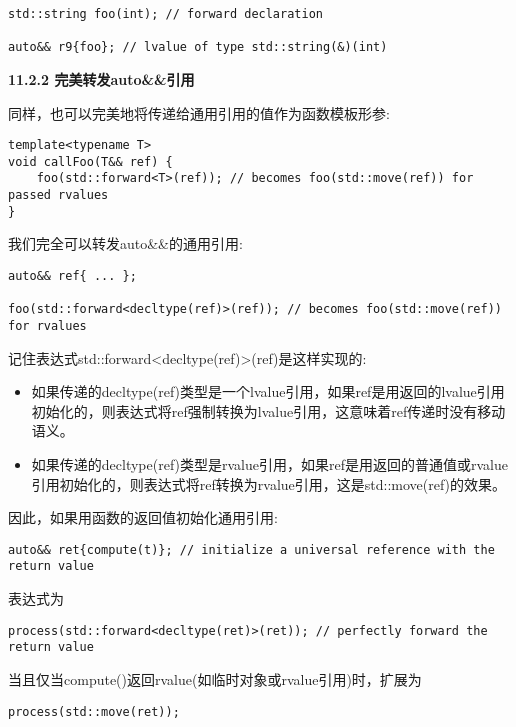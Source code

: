 \begin{lstlisting}[caption={}]
std::string foo(int); // forward declaration

auto&& r9{foo}; // lvalue of type std::string(&)(int)
\end{lstlisting}

\hspace*{\fill} \par %
\textbf{11.2.2 完美转发auto\&\&引用}

同样，也可以完美地将传递给通用引用的值作为函数模板形参:\par

\begin{lstlisting}[caption={}]
template<typename T>
void callFoo(T&& ref) {
	foo(std::forward<T>(ref)); // becomes foo(std::move(ref)) for passed rvalues
}
\end{lstlisting}

我们完全可以转发auto\&\&的通用引用:\par

\begin{lstlisting}[caption={}]
auto&& ref{ ... };

foo(std::forward<decltype(ref)>(ref)); // becomes foo(std::move(ref)) for rvalues
\end{lstlisting}

记住表达式std::forward<decltype(ref)>(ref)是这样实现的:\par

\begin{itemize}
	\item 如果传递的decltype(ref)类型是一个lvalue引用，如果ref是用返回的lvalue引用初始化的，则表达式将ref强制转换为lvalue引用，这意味着ref传递时没有移动语义。
	\item 如果传递的decltype(ref)类型是rvalue引用，如果ref是用返回的普通值或rvalue引用初始化的，则表达式将ref转换为rvalue引用，这是std::move(ref)的效果。
\end{itemize}

因此，如果用函数的返回值初始化通用引用:\par

\begin{lstlisting}[caption={}]
auto&& ret{compute(t)}; // initialize a universal reference with the return value
\end{lstlisting}

表达式为\par

\begin{lstlisting}[caption={}]
process(std::forward<decltype(ret)>(ret)); // perfectly forward the return value
\end{lstlisting}

当且仅当compute()返回rvalue(如临时对象或rvalue引用)时，扩展为\par

\begin{lstlisting}[caption={}]
process(std::move(ret));
\end{lstlisting}
























